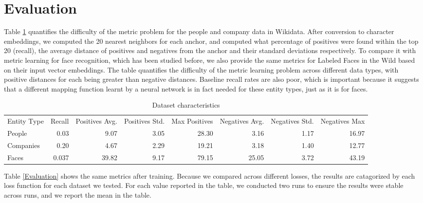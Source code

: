 \section{Evaluation}
\label{results}

Table \ref{Characteristics} quantifies the difficulty of the metric problem for the people and company data in Wikidata.  After conversion to character embeddings, we computed the 20 nearest neighbors for each anchor, and computed what percentage of positives were found within the top 20 (recall), the average distance of positives and negatives from the anchor and their standard deviations respectively.  To compare it with metric learning for face recognition, which has been studied before, we also provide the same metrics for Labeled Faces in the Wild based on their input vector embeddings.  The table quantifies the difficulty of the metric learning problem across different data types, with positive distances for each being greater than negative distances.  Baseline recall rates are also poor, which is important because it suggests that a different mapping function learnt by a neural network is in fact needed for these entity types, just as it is for faces.

\begin{table}[ht]
\caption{Dataset characteristics}
\label{Characteristics}
\begin{tabular}{l|r|r|r|r|r|r|r|}
\hline
Entity Type & Recall & Positives Avg. & Positives Std. & Max Positives & Negatives Avg. & Negatives Std. & Negatives Max \\
People & 0.03 & 9.07 & 3.05 & 28.30 & 3.16 & 1.17 & 16.97 \\
Companies & 0.20 & 4.67 & 2.29 & 19.21 & 3.18 & 1.40 & 12.77 \\
Faces & 0.037 & 39.82 & 9.17 & 79.15 & 25.05 & 3.72 & 43.19 \\
\end{tabular}
\end{table}

Table \ref{Evaluation} shows the same metrics after training.  Because we compared across different losses, the results are catagorized by each loss function for each dataset we tested.  For each value reported in the table, we conducted two runs to ensure the results were stable across runs, and we report the mean in the table.

